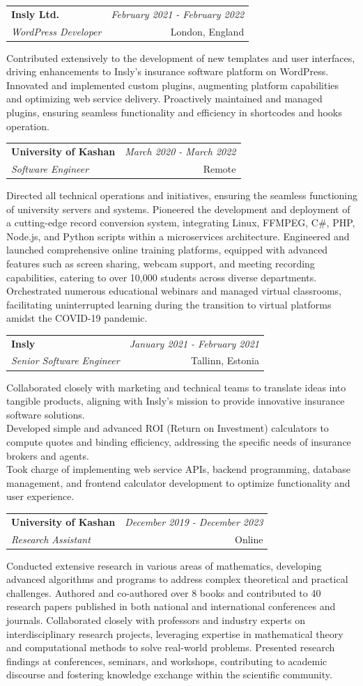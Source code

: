 \documentclass[a4paper,10pt]{article}
\makeatletter
\newcommand{\resumeSubheading}[4]{
	\vspace{0.5mm}\item
	\begin{tabular*}{0.98\textwidth}[t]{l@{\extracolsep{\fill}}r}
		\textbf{#1} & \textit{\footnotesize{#4}} \\
		\textit{\footnotesize{#3}} &  \footnotesize{#2}\\
	\end{tabular*}
	\vspace{-2.4mm}
}
\newcommand{\resumeItemListStart}{\begin{justify}\begin{itemize}[leftmargin=3ex, rightmargin=2ex, noitemsep,labelsep=1.2mm,itemsep=0mm]\small}
\newcommand{\resumeItemListEnd}{\end{itemize}\end{justify}\vspace{-2mm}}
\makeatother
\begin{document}
\vspace{-1mm}
\resumeSubheading
{Insly Ltd.}{London, England}
{WordPress Developer}{February 2021 - February 2022}
\resumeItemListStart
Contributed extensively to the development of new templates and user interfaces, driving enhancements to Insly's insurance software platform on WordPress. Innovated and implemented custom plugins, augmenting platform capabilities and optimizing web service delivery. Proactively maintained and managed plugins, ensuring seamless functionality and efficiency in shortcodes and hooks operation.
\resumeItemListEnd

\vspace{-1mm}
\resumeSubheading
{University of Kashan}{Remote}
{Software Engineer}{March 2020 - March 2022}
\resumeItemListStart
Directed all technical operations and initiatives, ensuring the seamless functioning of university servers and systems. Pioneered the development and deployment of a cutting-edge record conversion system, integrating Linux, FFMPEG, C\#, PHP, Node.js, and Python scripts within a microservices architecture. Engineered and launched comprehensive online training platforms, equipped with advanced features such as screen sharing, webcam support, and meeting recording capabilities, catering to over 10,000 students across diverse departments. Orchestrated numerous educational webinars and managed virtual classrooms, facilitating uninterrupted learning during the transition to virtual platforms amidst the COVID-19 pandemic.
\resumeItemListEnd

\vspace{-1mm}
\resumeSubheading
{Insly}{Tallinn, Estonia}
{Senior Software Engineer}{January 2021 - February 2021}
\resumeItemListStart
Collaborated closely with marketing and technical teams to translate ideas into tangible products, aligning with Insly's mission to provide innovative insurance software solutions.\\
Developed simple and advanced ROI (Return on Investment) calculators to compute quotes and binding efficiency, addressing the specific needs of insurance brokers and agents.\\
Took charge of implementing web service APIs, backend programming, database management, and frontend calculator development to optimize functionality and user experience.
\resumeItemListEnd

\vspace{-1mm}
\resumeSubheading
{University of Kashan}{Online}
{Research Assistant}{December 2019 - December 2023}
\resumeItemListStart
Conducted extensive research in various areas of mathematics, developing advanced algorithms and programs to address complex theoretical and practical challenges. Authored and co-authored over 8 books and contributed to 40 research papers published in both national and international conferences and journals. Collaborated closely with professors and industry experts on interdisciplinary research projects, leveraging expertise in mathematical theory and computational methods to solve real-world problems. Presented research findings at conferences, seminars, and workshops, contributing to academic discourse and fostering knowledge exchange within the scientific community. 
\resumeItemListEnd
\end{document}
